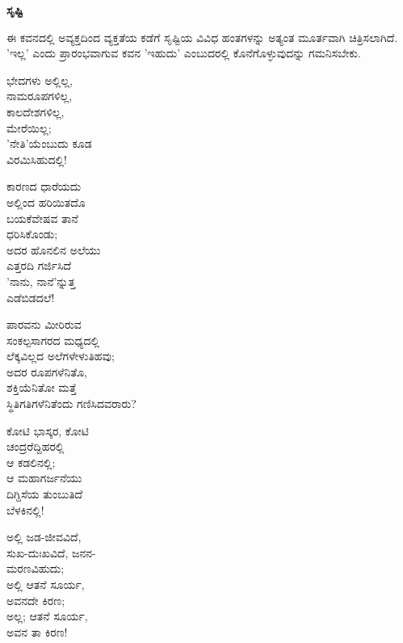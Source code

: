 
\begin{center}
\textbf{ಸೃಷ್ಟಿ}
\end{center}

ಈ ಕವನದಲ್ಲಿ ಅವ್ಯಕ್ತದಿಂದ ವ್ಯಕ್ತತೆಯ ಕಡೆಗೆ ಸೃಷ್ಟಿಯ ವಿವಿಧ ಹಂತಗಳನ್ನು ಅತ್ಯಂತ ಮೂರ್ತವಾಗಿ ಚಿತ್ರಿಸಲಾಗಿದೆ. 'ಇಲ್ಲ' ಎಂದು ಪ್ರಾರಂಭವಾಗುವ ಕವನ 'ಇಹುದು' ಎಂಬುದರಲ್ಲಿ ಕೊನೆಗೊಳ್ಳುವುದನ್ನು ಗಮನಿಸಬೇಕು.

\begin{myquote}
ಭೇದಗಳು ಅಲ್ಲಿಲ್ಲ,\\ನಾಮರೂಪಗಳಿಲ್ಲ,\\ಕಾಲದೇಶಗಳಿಲ್ಲ,\\ಮೇರೆಯಿಲ್ಲ;\\'ನೇತಿ'ಯೆಂಬುದು ಕೂಡ\\ವಿರಮಿಸಿಹುದಲ್ಲಿ!
\end{myquote}

\begin{myquote}
ಕಾರಣದ ಧಾರೆಯದು\\ಅಲ್ಲಿಂದ ಹರಿಯಿತದೊ\\ಬಯಕೆವೇಷವ ತಾನೆ\\ಧರಿಸಿಕೊಂಡು;\\ಅದರ ಹೊನಲಿನ ಅಲೆಯು\\ಎತ್ತರದಿ ಗರ್ಜಿಸಿದೆ\\'ನಾನು, ನಾನೆ'ನ್ನುತ್ತ\\ಎಡೆಬಿಡದಲೆ!
\end{myquote}

\begin{myquote}
ಪಾರವನು ಮೀರಿರುವ\\ಸಂಕಲ್ಪಸಾಗರದ ಮಧ್ಯದಲ್ಲಿ\\ಲೆಕ್ಕವಿಲ್ಲದ ಅಲೆಗಳೇಳುತಿಹವು;\\ಅದರ ರೂಪಗಳೆನಿತೊ,\\ಶಕ್ತಿಯೆನಿತೋ ಮತ್ತೆ\\ಸ್ಥಿತಿಗತಿಗಳೆನಿತೆಂದು ಗಣಿಸಿದವರಾರು?
\end{myquote}

\begin{myquote}
ಕೋಟಿ ಭಾಸ್ಕರ, ಕೋಟಿ\\ಚಂದ್ರರೆದ್ದಿಹರಲ್ಲಿ\\ಆ ಕಡಲಿನಲ್ಲಿ;\\ಆ ಮಹಾಗರ್ಜನೆಯು\\ದಿಗ್ದಿಸೆಯ ತುಂಬುತಿದೆ\\ಬೆಳಕಿನಲ್ಲಿ!
\end{myquote}

\begin{myquote}
ಅಲ್ಲಿ ಜಡ-ಜೀವವಿದೆ,\\ಸುಖ-ದುಃಖವಿದೆ, ಜನನ-\\ಮರಣವಿಹುದು;\\ಅಲ್ಲಿ ಆತನೆ ಸೂರ್ಯ,\\ಅವನದೇ ಕಿರಣ;\\ಅಲ್ಲ; ಆತನೆ ಸೂರ್ಯ,\\ಅವನ ತಾ ಕಿರಣ!
\end{myquote}

